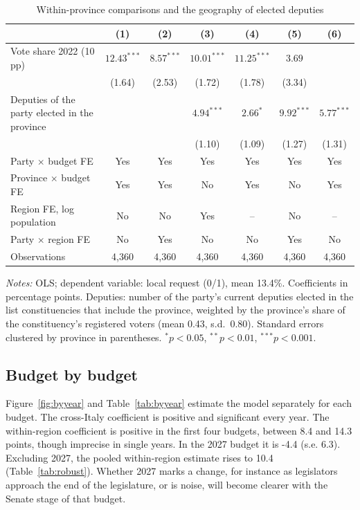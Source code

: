 \documentclass[12pt]{article}
\begin{document}
\begin{table}[htbp]\centering\footnotesize\setlength{\tabcolsep}{4pt}
\begin{threeparttable}
\caption{Within-province comparisons and the geography of elected deputies}\label{tab:mp}
\begin{tabular}{lcccccc}
\toprule
 & (1) & (2) & (3) & (4) & (5) & (6) \\
\midrule
Vote share 2022 (10 pp) & $12.43^{***}$ & $8.57^{***}$ & $10.01^{***}$ & $11.25^{***}$ & $3.69$ & \\
 & (1.64) & (2.53) & (1.72) & (1.78) & (3.34) & \\
Deputies of the party elected in the province & & & $4.94^{***}$ & $2.66^{*}$ & $9.92^{***}$ & $5.77^{***}$ \\
 & & & (1.10) & (1.09) & (1.27) & (1.31) \\[3pt]
Party $\times$ budget FE & Yes & Yes & Yes & Yes & Yes & Yes \\
Province $\times$ budget FE & Yes & Yes & No & Yes & No & Yes \\
Region FE, log population & No & No & Yes & -- & No & -- \\
Party $\times$ region FE & No & Yes & No & No & Yes & No \\
Observations & 4,360 & 4,360 & 4,360 & 4,360 & 4,360 & 4,360 \\
\bottomrule
\end{tabular}
\begin{tablenotes}\footnotesize
\item \emph{Notes:} OLS; dependent variable: local request (0/1), mean 13.4\%. Coefficients in percentage points. Deputies: number of the party's current deputies elected in the list constituencies that include the province, weighted by the province's share of the constituency's registered voters (mean 0.43, s.d.\ 0.80). Standard errors clustered by province in parentheses. $^{*}p<0.05$, $^{**}p<0.01$, $^{***}p<0.001$.
\end{tablenotes}
\end{threeparttable}
\end{table}

\subsection{Budget by budget}

Figure~\ref{fig:byyear} and Table~\ref{tab:byyear} estimate the model separately for each budget. The cross-Italy coefficient is positive and significant every year. The within-region coefficient is positive in the first four budgets, between 8.4 and 14.3 points, though imprecise in single years. In the 2027 budget it is -4.4 (s.e. 6.3). Excluding 2027, the pooled within-region estimate rises to 10.4 (Table~\ref{tab:robust}). Whether 2027 marks a change, for instance as legislators approach the end of the legislature, or is noise, will become clearer with the Senate stage of that budget.
\end{document}
